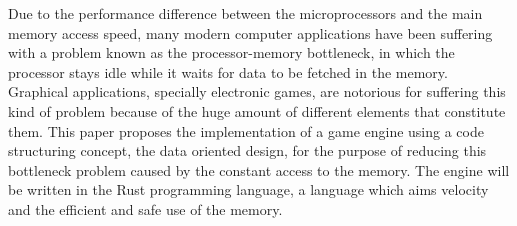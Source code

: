 Due to the performance difference between the microprocessors and the main memory access 
speed, many modern computer applications have been suffering with a problem known as 
the processor-memory bottleneck, in which the processor stays idle while it waits for 
data to be fetched in the memory. Graphical applications, specially electronic games, are 
notorious for suffering this kind of problem because of the huge amount of different 
elements that constitute them. This paper proposes the implementation of a game engine
using a code structuring concept, the data oriented design, for the purpose of reducing
this bottleneck problem caused by the constant access to the memory. The engine will be 
written in the Rust programming language, a language which aims velocity and the efficient 
and safe use of the memory.

